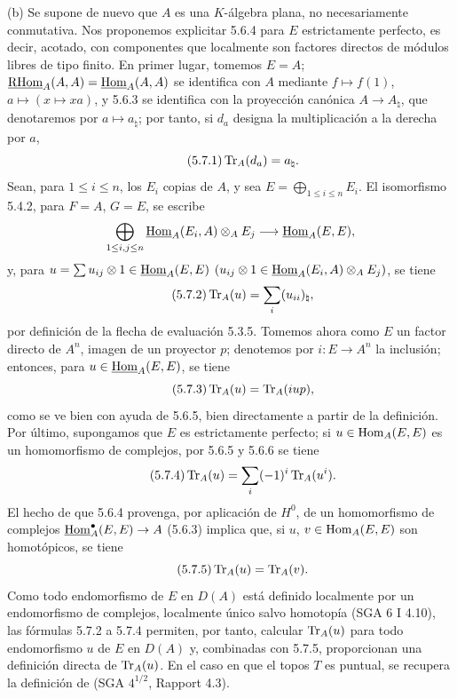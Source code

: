 (b) Se supone de nuevo que $A$ es una $K$-álgebra plana, no necesariamente conmutativa. Nos proponemos explicitar 5.6.4 para $E$ estrictamente perfecto, es decir, acotado, con componentes que localmente son factores directos de módulos libres de tipo finito. En primer lugar, tomemos $E=A$; $\underline{\mathrm{RHom}}_A(A,A)=\underline{\operatorname{Hom}}_A(A,A)$ se identifica con $A$ mediante $f\mapsto f(1)$, $a\mapsto(x\mapsto xa)$, y 5.6.3 se identifica con la proyección canónica $A\to A_\natural$, que denotaremos por $a\mapsto a_\natural$; por tanto, si $d_a$ designa la multiplicación a la derecha por $a$,
\begin{equation}\tag{5.7.1}
\operatorname{Tr}_A(d_a)=a_\natural.
\end{equation}
Sean, para $1\le i\le n$, los $E_i$ copias de $A$, y sea $E=\bigoplus_{1\le i\le n}E_i$. El isomorfismo 5.4.2, para $F=A$, $G=E$, se escribe
\[
\bigoplus_{1\le i,j\le n}\underline{\operatorname{Hom}}_A(E_i,A)\otimes_AE_j\longrightarrow\underline{\operatorname{Hom}}_A(E,E),
\]
y, para $u=\sum u_{ij}\otimes 1\in\underline{\operatorname{Hom}}_A(E,E)$ $(u_{ij}\otimes 1\in\underline{\operatorname{Hom}}_A(E_i,A)\otimes_A E_j)$, se tiene
\begin{equation}\tag{5.7.2}
\operatorname{Tr}_A(u)=\sum_i (u_{ii})_\natural,
\end{equation}
por definición de la flecha de evaluación 5.3.5. Tomemos ahora como $E$ un factor directo de $A^n$, imagen de un proyector $p$; denotemos por $i:E\to A^n$ la inclusión; entonces, para $u\in\underline{\operatorname{Hom}}_A(E,E)$, se tiene
\begin{equation}\tag{5.7.3}
\operatorname{Tr}_A(u)=\operatorname{Tr}_A(iup),
\end{equation}
como se ve bien con ayuda de 5.6.5, bien directamente a partir de la definición. Por último, supongamos que $E$ es estrictamente perfecto; si $u\in\operatorname{Hom}_A(E,E)$ es un homomorfismo de complejos, por 5.6.5 y 5.6.6 se tiene
\begin{equation}\tag{5.7.4}
\operatorname{Tr}_A(u)=\sum_i(-1)^i\operatorname{Tr}_A(u^i).
\end{equation}
El hecho de que 5.6.4 provenga, por aplicación de $H^0$, de un homomorfismo de complejos $\underline{\operatorname{Hom}}_A^\bullet(E,E)\to A$ (5.6.3) implica que, si $u$, $v\in\operatorname{Hom}_A(E,E)$ son homotópicos, se tiene
\begin{equation}\tag{5.7.5}
\operatorname{Tr}_A(u)=\operatorname{Tr}_A(v).
\end{equation}
Como todo endomorfismo de $E$ en $D(A)$ está definido localmente por un endomorfismo de complejos, localmente único salvo homotopía (SGA 6 I 4.10), las fórmulas 5.7.2 a 5.7.4 permiten, por tanto, calcular $\operatorname{Tr}_A(u)$ para todo endomorfismo $u$ de $E$ en $D(A)$ y, combinadas con 5.7.5, proporcionan una definición directa de $\operatorname{Tr}_A(u)$. En el caso en que el topos $T$ es puntual, se recupera la definición de (SGA $4^{1/2}$, Rapport 4.3).
